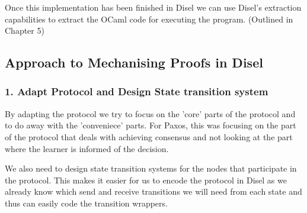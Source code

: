 Once this implementation has been finished in Disel we can use Disel's extraction
capabilities to extract the OCaml code for executing the program. (Outlined in Chapter 5)


\subsection{Approach to Mechanising Proofs in Disel}
%
%
%
%
%
%
%
%
%

\subsubsection{1. Adapt Protocol and Design State transition system}
By adapting the protocol we try to focus on the 'core' parts of the protocol
and to do away with the 'conveniece' parts. For Paxos, this was focusing on the
part of the protocol that deals with achieving consensus and not looking at the
part where the learner is informed of the decision.

We also need to design state transition systems for the nodes that participate
in the protocol. This makes it easier for us to encode the protocol in Disel as
we already know which send and receive transitions we will need from each state
and thus can easily code the transition wrappers.

